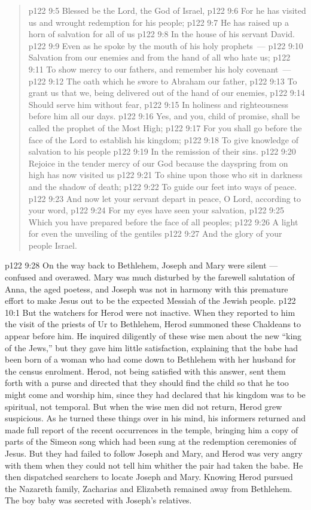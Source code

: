 \begin{quote}
\vs p122 9:5 Blessed be the Lord, the God of Israel,
\vs p122 9:6 For he has visited us and wrought redemption for his people;
\vs p122 9:7 He has raised up a horn of salvation for all of us
\vs p122 9:8 In the house of his servant David.
\vs p122 9:9 Even as he spoke by the mouth of his holy prophets~---
\vs p122 9:10 Salvation from our enemies and from the hand of all who hate us;
\vs p122 9:11 To show mercy to our fathers, and remember his holy covenant~---
\vs p122 9:12 The oath which he swore to Abraham our father,
\vs p122 9:13 To grant us that we, being delivered out of the hand of our enemies,
\vs p122 9:14 Should serve him without fear,
\vs p122 9:15 In holiness and righteousness before him all our days.
\vs p122 9:16 Yes, and you, child of promise, shall be called the prophet of the Most High;
\vs p122 9:17 For you shall go before the face of the Lord to establish his kingdom;
\vs p122 9:18 To give knowledge of salvation to his people
\vs p122 9:19 In the remission of their sins.
\vs p122 9:20 Rejoice in the tender mercy of our God because the dayspring from on high has now visited us
\vs p122 9:21 To shine upon those who sit in darkness and the shadow of death;
\vs p122 9:22 To guide our feet into ways of peace.
\vs p122 9:23 And now let your servant depart in peace, O Lord, according to your word,
\vs p122 9:24 For my eyes have seen your salvation,
\vs p122 9:25 Which you have prepared before the face of all peoples;
\vs p122 9:26 A light for even the unveiling of the gentiles
\vs p122 9:27 And the glory of your people Israel.
\end{quote}
\vs p122 9:28 \pc On the way back to Bethlehem, Joseph and Mary were silent --- confused and overawed. Mary was much disturbed by the farewell salutation of Anna, the aged poetess, and Joseph was not in harmony with this premature effort to make Jesus out to be the expected Messiah of the Jewish people.
\vs p122 10:1 But the watchers for Herod were not inactive. When they reported to him the visit of the priests of Ur to Bethlehem, Herod summoned these Chaldeans to appear before him. He inquired diligently of these wise men about the new “king of the Jews,” but they gave him little satisfaction, explaining that the babe had been born of a woman who had come down to Bethlehem with her husband for the census enrolment. Herod, not being satisfied with this answer, sent them forth with a purse and directed that they should find the child so that he too might come and worship him, since they had declared that his kingdom was to be spiritual, not temporal. But when the wise men did not return, Herod grew suspicious. As he turned these things over in his mind, his informers returned and made full report of the recent occurrences in the temple, bringing him a copy of parts of the Simeon song which had been sung at the redemption ceremonies of Jesus. But they had failed to follow Joseph and Mary, and Herod was very angry with them when they could not tell him whither the pair had taken the babe. He then dispatched searchers to locate Joseph and Mary. Knowing Herod pursued the Nazareth family, Zacharias and Elizabeth remained away from Bethlehem. The boy baby was secreted with Joseph’s relatives.
